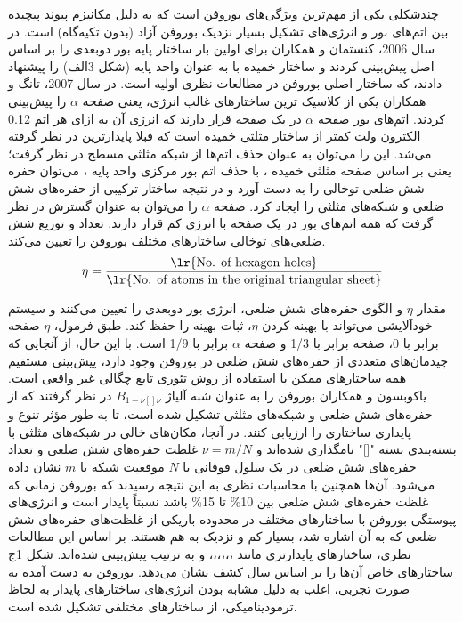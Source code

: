 چندشکلی یکی از مهم‌ترین ویژگی‌های بوروفن است که به دلیل مکانیزم پیوند پیچیده بین اتم‌های بور و انرژی‌های تشکیل بسیار نزدیک بوروفن آزاد (بدون تکیه‌گاه) است. در سال 2006، کنستمان و همکاران \cite{kunstmannBroadBoronSheets2006} برای اولین بار ساختار پایه بور دوبعدی را بر اساس اصل  پیش‌بینی کردند و ساختار خمیده با  به عنوان واحد پایه (شکل 3الف) را پیشنهاد دادند، که ساختار اصلی بوروفن در مطالعات نظری اولیه است. در سال 2007، تانگ و همکاران \cite{tangSelfdopingBoronSheets2009, tangNovelPrecursorsBoron2007} یکی از کلاسیک‌ ترین ساختارهای غالب انرژی، یعنی صفحه $\alpha$ را پیش‌بینی کردند. اتم‌های بور صفحه $\alpha$ در یک صفحه قرار دارند که انرژی آن به ازای هر اتم 0.12 الکترون ولت کمتر از ساختار مثلثی خمیده است که قبلا پایدارترین در نظر گرفته می‌شد. این را می‌توان به عنوان حذف اتم‌ها از شبکه مثلثی مسطح در نظر گرفت؛ یعنی بر اساس صفحه مثلثی خمیده ، با حذف اتم بور مرکزی واحد پایه ، می‌توان حفره شش ضلعی توخالی را به دست آورد و در نتیجه ساختار ترکیبی از حفره‌های شش ضلعی و شبکه‌های مثلثی را ایجاد کرد. صفحه $\alpha$ را می‌توان به عنوان گسترش  در نظر گرفت که همه اتم‌های بور در یک صفحه با انرژی کم قرار دارند. تعداد و توزیع شش ضلعی‌های توخالی  ساختارهای مختلف بوروفن را تعیین می‌کند.
\begin{equation}
    \eta=\frac{\text{\lr{No. of hexagon holes}}}{\text{\lr{No. of atoms in the original triangular sheet}}}
\end{equation}

مقدار $\eta$ و الگوی حفره‌های شش ضلعی، انرژی بور دوبعدی را تعیین می‌کنند و سیستم خودآلایشی می‌تواند با بهینه کردن $\eta$، ثبات بهینه را حفظ کند. طبق فرمول، $\eta$ صفحه  برابر با 0، صفحه  برابر با 1/3 و صفحه $\alpha$ برابر با 1/9 است. \cite{yuPredictionTwoDimensionalBoron2012} با این حال، از آنجایی که چیدمان‌های متعددی از حفره‌های شش ضلعی در بوروفن وجود دارد، پیش‌بینی مستقیم همه ساختارهای ممکن با استفاده از روش تئوری تابع چگالی  غیر واقعی است. یاکوبسون و همکاران \cite{penevPolymorphismTwoDimensionalBoron2012} بوروفن را به عنوان شبه آلیاژ $B_{1-\nu[]\nu}$ در نظر گرفتند که از حفره‌های شش ضلعی و شبکه‌های مثلثی تشکیل شده است، تا به طور مؤثر تنوع و پایداری ساختاری را ارزیابی کنند. در آنجا، مکان‌های خالی در شبکه‌های مثلثی با بسته‌بندی بسته "[]" نامگذاری شده‌اند و $\nu = m/N$ غلظت حفره‌های شش ضلعی و تعداد حفره‌های شش ضلعی در یک سلول فوقانی با $N$ موقعیت شبکه با $m$ نشان داده می‌شود.\cite{zhangTwodimensionalBoronStructures2017} آن‌ها همچنین با محاسبات نظری به این نتیجه رسیدند که بوروفن زمانی که غلظت حفره‌های شش ضلعی بین 10\% تا 15\% باشد نسبتاً پایدار است و انرژی‌های پیوستگی بوروفن با ساختارهای مختلف در محدوده باریکی از غلظت‌های حفره‌های شش ضلعی که به آن اشاره شد، بسیار کم و نزدیک به هم هستند. بر اساس این مطالعات نظری، ساختارهای پایدارتری مانند ،،،،،، و به ترتیب پیش‌بینی شده‌اند. \cite{zhouSemimetallicTwoDimensionalBoron2014, wuTwoDimensionalBoronMonolayer2012, penevPolymorphismTwoDimensionalBoron2012, yuPredictionTwoDimensionalBoron2012, zopeSnubBoronNanostructures2011} شکل 1ج ساختارهای خاص آن‌ها را بر اساس سال کشف نشان می‌دهد. بوروفن به دست آمده به صورت تجربی، اغلب به دلیل مشابه بودن انرژی‌های ساختارهای پایدار به لحاظ ترمودینامیکی، از ساختارهای مختلفی تشکیل شده است.

